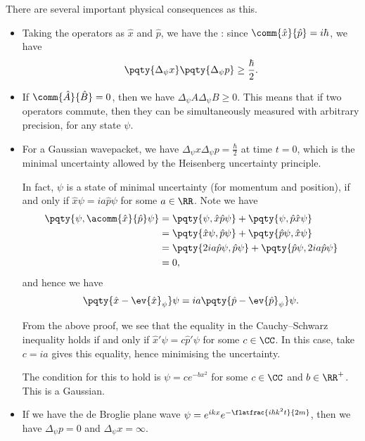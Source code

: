 There are several important physical consequences as this.

\begin{itemize}
    \item Taking the operators as \(\hat{x}\) and \(\hat{p}\), we have the : since \(\comm{\hat{x}}{\hat{p}} = i \hbar\), we have
    \begin{equation}
        \pqty{\Delta_\psi x} \pqty{\Delta_\psi p} \geq \frac{\hbar}{2}.
    \end{equation}

    \item If \(\comm{\hat{A}}{\hat{B}} = 0\), then we have \(\Delta_\psi A \Delta_\psi B \geq 0\). This means that if two operators commute, then they can be simultaneously measured with arbitrary precision, for any state \(\psi\).
    \item For a Gaussian wavepacket, we have \(\Delta_\psi x \Delta_\psi p = \frac{\hbar}{2}\) at time \(t = 0\), which is the minimal uncertainty allowed by the Heisenberg uncertainty principle.
    
    In fact, \(\psi\) is a state of minimal uncertainty (for momentum and position), if and only if \(\hat{x} \psi = i a \hat{p} \psi\) for some \(a \in \RR\). Note we have
    \begin{subequations}
        \begin{align}
            \pqty{\psi, \acomm{\hat{x}}{\hat{p}} \psi} &= \pqty{\psi, \hat{x} \hat{p} \psi} + \pqty{\psi, \hat{p} \hat{x} \psi} \\
            &= \pqty{\hat{x} \psi, \hat{p} \psi} + \pqty{\hat{p} \psi, \hat{x} \psi} \\
            &= \pqty{2 i a \hat{p} \psi, \hat{p} \psi} + \pqty{\hat{p} \psi, 2 i a \hat{p} \psi} \\
            &= 0,
        \end{align}
    \end{subequations}
    and hence we have
    \begin{equation}
        \pqty{\hat{x} - \ev{\hat{x}}_\psi} \psi = i a \pqty{\hat{p} - \ev{\hat{p}}_\psi} \psi.
    \end{equation}

    From the above proof, we see that the equality in the Cauchy--Schwarz inequality holds if and only if \(\hat{x}' \psi = c \hat{p}' \psi\) for some \(c \in \CC\). In this case, take \(c = ia\) gives this equality, hence minimising the uncertainty.
    
    The condition for this to hold is \(\psi = c e^{- b x^2}\) for some \(c \in \CC\) and \(b \in \RR^+\). This is a Gaussian.

    \item If we have the de Broglie plane wave \(\psi = e^{i k x} e^{- \flatfrac{i \hbar k^2 t}{2m}}\), then we have \(\Delta_\psi p = 0\) and \(\Delta_\psi x = \infty\).
\end{itemize}

